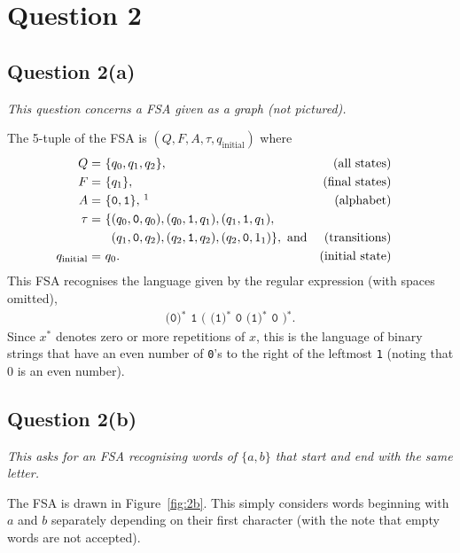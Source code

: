 \documentclass[a4paper]{article}
\begin{document}
\section*{Question 2}
\subsection*{Question 2(a)}
\begin{center}
  \textit{This question concerns a FSA given as a graph (not pictured).}
\end{center}
The 5-tuple of the FSA is $(Q, F, A, \tau, q_\text{initial})$
where
\renewcommand*{\thefootnote}{\text{note~}\arabic{footnote}}
\begin{align*}
  Q =~& \{q_0, q_1, q_2\}, & \text{(all states)}\\
  F =~& \{q_1\}, & \text{(final states)} \\ 
  A =~& \{\texttt 0, \texttt 1\},\,\footnotemark& \text{(alphabet)}& \\
  \tau =~& \{(q_0,\texttt0,q_0), (q_0,\texttt1,q_1), (q_1,\texttt1,q_1),\\
  ~&~\,(q_1,\texttt0,q_2), (q_2,\texttt1,q_2), (q_2,\texttt0,1_1)\},\text{ and} &\text{(transitions)}\\
        q_{\text{initial}} =~& q_0. &\text{(initial state)}
\end{align*}
\renewcommand*{\thefootnote}{\arabic{footnote}}
This FSA recognises the language given by the regular expression
(with spaces omitted),
\begin{align*}
  \texttt{(0)$^*$ 1 ( (1)$^*$ 0 (1)$^*$ 0 )$^*$}.
\end{align*}
Since $x^*$ denotes zero or more repetitions of $x$,
this is the language of binary strings that have an even number of \texttt 0's to the right of the leftmost \texttt 1 (noting that 0 is an even number). 


\subsection*{Question 2(b)}
\begin{center}
  \textit{This asks for an FSA recognising words of $\{a,b\}$
  that start and end with the same letter.}
\end{center}
The FSA is drawn in Figure~\ref{fig:2b}.
This simply considers words beginning with $a$ and $b$ separately depending
on their first character (with the note that empty words are not accepted).
\end{document}
